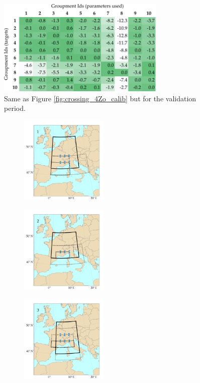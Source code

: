 \documentclass[5p]{elsarticle}
\begin{document}
\begin{figure}[htb]
	\centerline{\includegraphics[width=8cm]{figures/table_crossing_z4_valid.pdf}}
	\caption{Same as Figure \ref{fig:crossing_4Zo_calib} but for the validation period.}
	\label{fig:crossing_4Zo_valid}
\end{figure}


\begin{figure}[htb]
	\centering
	\begin{subfigure}{.5\columnwidth}
		\centering
		\includegraphics[width=4.2cm]{figures/spatial_win_z4-hi2/Spatial_windows_1.png}
	\end{subfigure}%
	\begin{subfigure}{.5\columnwidth}
		\centering
		\includegraphics[width=4.2cm]{figures/spatial_win_z4-hi2/Spatial_windows_2.png}
	\end{subfigure}
	\begin{subfigure}{.5\columnwidth}
		\centering
		\includegraphics[width=4.2cm]{figures/spatial_win_z4-hi2/Spatial_windows_3.png}

\end{subfigure}
\end{figure}
\end{document}

